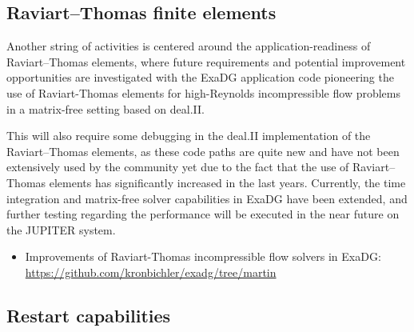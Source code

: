 \documentclass[a4paper,12pt]{article}
\begin{document}
\subsection{Raviart--Thomas finite elements}

Another string of activities is centered around the application-readiness of Raviart--Thomas elements, where future requirements and potential improvement opportunities are investigated with the ExaDG application code pioneering the use of Raviart-Thomas elements for high-Reynolds incompressible flow problems in a matrix-free setting based on deal.II.

This will also require some debugging in the deal.II implementation of the
Raviart--Thomas elements, as these code paths are quite new and have not been
extensively used by the community yet due to the fact that the use of
Raviart--Thomas elements has significantly increased in the last
years. Currently, the time integration and matrix-free solver capabilities in
ExaDG have been extended, and further testing regarding the performance will
be executed in the near future on the JUPITER system.
\begin{itemize}
\item Improvements of Raviart-Thomas incompressible flow solvers in ExaDG:\\
  \href{https://github.com/kronbichler/exadg/tree/martin}{https://github.com/kronbichler/exadg/tree/martin}
\end{itemize}

\subsection{Restart capabilities}
\end{document}
